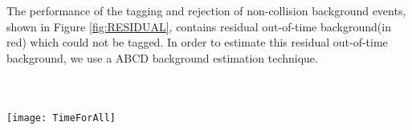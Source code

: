 \paragraph*{}\mbox{}\\
The performance of the tagging and rejection of non-collision background events, shown in Figure \ref{fig:RESIDUAL}, contains residual out-of-time background(in red) which could not be tagged. In order to estimate this residual out-of-time background, we use a \textsf{ABCD} background estimation technique.

\paragraph*{}\mbox{}\\
\begin{minipage}{\linewidth} 
\begin{center}
  \captionsetup{type=figure}
   \texttt{[image: TimeForAll]}
   \label{fig:RESIDUAL}
\end{center}
\end{minipage}
%
